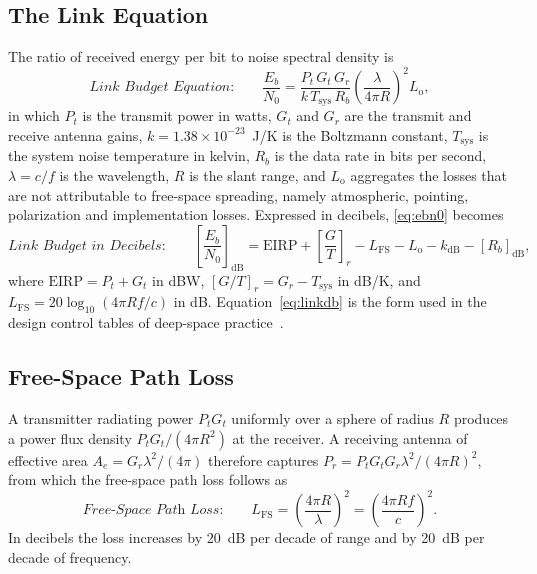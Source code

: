 \documentclass[11pt,a4paper]{article}
\begin{document}
\subsection{The Link Equation}
The ratio of received energy per bit to noise spectral density is
\begin{equation}
\label{eq:ebn0}
\textit{Link Budget Equation:}\qquad
\frac{E_b}{N_0} = \frac{P_t \, G_t \, G_r}{k \, T_{\mathrm{sys}} \, R_b} \left(\frac{\lambda}{4\pi R}\right)^{2} L_{\mathrm{o}},
\end{equation}
in which $P_t$ is the transmit power in watts, $G_t$ and $G_r$ are the transmit and receive antenna gains, $k = 1.38 \times 10^{-23}$~J/K is the Boltzmann constant, $T_{\mathrm{sys}}$ is the system noise temperature in kelvin, $R_b$ is the data rate in bits per second, $\lambda = c/f$ is the wavelength, $R$ is the slant range, and $L_{\mathrm{o}}$ aggregates the losses that are not attributable to free-space spreading, namely atmospheric, pointing, polarization and implementation losses. Expressed in decibels, \eqref{eq:ebn0} becomes
\begin{equation}
\label{eq:linkdb}
\textit{Link Budget in Decibels:}\qquad
\left[\frac{E_b}{N_0}\right]_{\mathrm{dB}} = \mathrm{EIRP} + \left[\frac{G}{T}\right]_{r} - L_{\mathrm{FS}} - L_{\mathrm{o}} - k_{\mathrm{dB}} - [R_b]_{\mathrm{dB}},
\end{equation}
where $\mathrm{EIRP} = P_t + G_t$ in dBW, $[G/T]_r = G_r - T_{\mathrm{sys}}$ in dB/K, and $L_{\mathrm{FS}} = 20\log_{10}(4\pi R f / c)$ in dB. Equation~\eqref{eq:linkdb} is the form used in the design control tables of deep-space practice~\cite{yuen_descanso,dsn_810_005}.

\subsection{Free-Space Path Loss}
A transmitter radiating power $P_t G_t$ uniformly over a sphere of radius $R$ produces a power flux density $P_t G_t / (4\pi R^2)$ at the receiver. A receiving antenna of effective area $A_e = G_r \lambda^2 / (4\pi)$ therefore captures $P_r = P_t G_t G_r \lambda^2 / (4\pi R)^2$, from which the free-space path loss follows as
\begin{equation}
\label{eq:fspl}
\textit{Free-Space Path Loss:}\qquad
L_{\mathrm{FS}} = \left(\frac{4\pi R}{\lambda}\right)^{2} = \left(\frac{4\pi R f}{c}\right)^{2}.
\end{equation}
In decibels the loss increases by \SI{20}{dB} per decade of range and by \SI{20}{dB} per decade of frequency.
\end{document}
